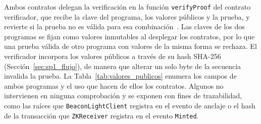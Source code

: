 Ambos contratos delegan la verificación en la función \lstinline|verifyProof| del contrato
verificador, que recibe la clave del programa, los valores públicos y la prueba, y revierte si la
prueba no es válida para esa combinación~\cite{sp1contracts}. Las claves de los dos programas se
fijan como valores inmutables al desplegar los contratos, por lo que una prueba válida de otro
programa con valores de la misma forma se rechaza. El verificador incorpora los valores públicos a
través de su hash SHA-256 (Sección~\ref{sec:sp1_flujo}), de manera que alterar un solo byte de la
secuencia invalida la prueba. La Tabla~\ref{tab:valores_publicos} enumera los campos de ambos
programas y el uso que hacen de ellos los contratos. Algunos no intervienen en ninguna
comprobación y se exponen con fines de trazabilidad, como las raíces que
\texttt{BeaconLightClient} registra en el evento de anclaje o el hash de la transacción que
\texttt{ZKReceiver} registra en el evento \texttt{Minted}.

